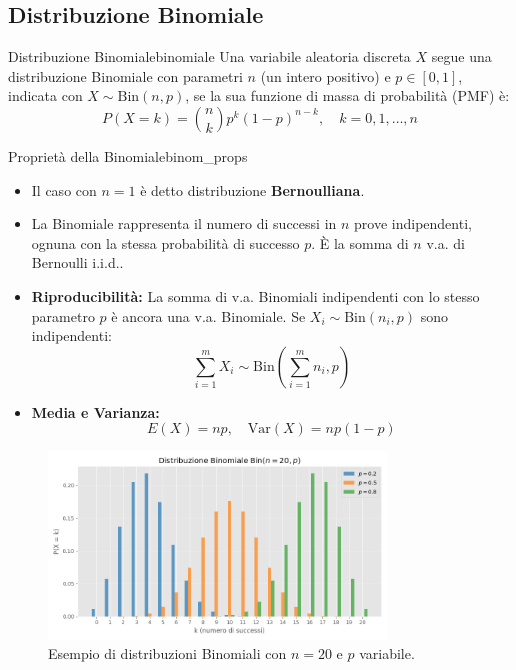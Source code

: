 \subsection{Distribuzione Binomiale}

\begin{definizione}{Distribuzione Binomiale}{binomiale}
Una variabile aleatoria discreta \(X\) segue una distribuzione Binomiale con parametri \(n\) (un intero positivo) e \(p \in [0,1]\), indicata con \(X \sim \text{Bin}(n,p)\), se la sua funzione di massa di probabilità (PMF) è:
\[
P(X=k) = \binom{n}{k} p^k (1-p)^{n-k}, \quad k=0, 1, \dots, n \text{}
\]
\end{definizione}

\begin{proposizione}{Proprietà della Binomiale}{binom_props}
\begin{itemize}
    \item Il caso con \(n=1\) è detto distribuzione \textbf{Bernoulliana}.
    \item La Binomiale rappresenta il numero di successi in \(n\) prove indipendenti, ognuna con la stessa probabilità di successo \(p\). È la somma di \(n\) v.a. di Bernoulli i.i.d..
    \item \textbf{Riproducibilità:} La somma di v.a. Binomiali indipendenti con lo stesso parametro \(p\) è ancora una v.a. Binomiale. Se \(X_i \sim \text{Bin}(n_i, p)\) sono indipendenti:
    \[ \sum_{i=1}^{m} X_i \sim \text{Bin}\left(\sum_{i=1}^{m} n_i, p\right) \text{} \]
    \item \textbf{Media e Varianza:}
    \[ E(X) = np, \quad \text{Var}(X) = np(1-p) \]
\end{itemize}
\end{proposizione}

\begin{figure}[H]
    \centering
    \includegraphics[width=0.8\textwidth]{images/binomiale.png}
    \caption{Esempio di distribuzioni Binomiali con \(n = 20\) e \(p\) variabile.}
    \label{fig:binomiale}
\end{figure}

